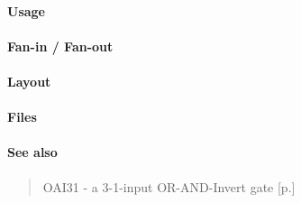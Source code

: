 \paragraph{Usage}

\paragraph{Fan-in / Fan-out}

\paragraph{Layout}

\paragraph{Files}

\paragraph{See also}
\begin{quote}
    OAI31 - a 3-1-input OR-AND-Invert gate [p.\pageref{OAI31}]
\end{quote}
